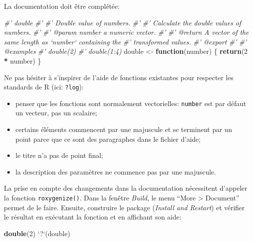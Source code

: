 \documentclass[
  12pt,
  french,
  a4paper,
  extrafontsizes,onecolumn,openright
  ]{memoir}
\newenvironment{Shaded}{\begin{snugshade}}{\end{snugshade}}
\newcommand{\CommentTok}[1]{\textcolor[rgb]{0.56,0.35,0.01}{\textit{#1}}}
\newcommand{\ControlFlowTok}[1]{\textcolor[rgb]{0.13,0.29,0.53}{\textbf{#1}}}
\newcommand{\DataTypeTok}[1]{\textcolor[rgb]{0.13,0.29,0.53}{#1}}
\newcommand{\DecValTok}[1]{\textcolor[rgb]{0.00,0.00,0.81}{#1}}
\newcommand{\KeywordTok}[1]{\textcolor[rgb]{0.13,0.29,0.53}{\textbf{#1}}}
\newcommand{\NormalTok}[1]{#1}
\newcommand{\OperatorTok}[1]{\textcolor[rgb]{0.81,0.36,0.00}{\textbf{#1}}}
\newcommand{\StringTok}[1]{\textcolor[rgb]{0.31,0.60,0.02}{#1}}
\providecommand{\tightlist}{%
  \setlength{\itemsep}{0pt}\setlength{\parskip}{0pt}}
\begin{document}
La documentation doit être complétée:

\scriptsize

\begin{Shaded}
\begin{Highlighting}[]
\CommentTok{#' double}
\CommentTok{#' }
\CommentTok{#' Double value of numbers.}
\CommentTok{#'}
\CommentTok{#' Calculate the double values of numbers.}
\CommentTok{#' }
\CommentTok{#' @param number a numeric vector.}
\CommentTok{#'}
\CommentTok{#' @return A vector of the same length as `number` containing the }
\CommentTok{#'   transformed values.}
\CommentTok{#' @export}
\CommentTok{#'}
\CommentTok{#' @examples}
\CommentTok{#' double(2)}
\CommentTok{#' double(1:4)}
\NormalTok{double <-}\StringTok{ }\ControlFlowTok{function}\NormalTok{(number) \{}
    \KeywordTok{return}\NormalTok{(}\DecValTok{2} \OperatorTok{*}\StringTok{ }\NormalTok{number)}
\NormalTok{\}}
\end{Highlighting}
\end{Shaded}

\normalsize

Ne pas hésiter à s'inspirer de l'aide de fonctions existantes pour respecter les standards de R (ici: \texttt{?log}):

\begin{itemize}
\tightlist
\item
  penser que les fonctions sont normalement vectorielles: \texttt{number} est par défaut un vecteur, pas un scalaire;
\item
  certains éléments commencent par une majuscule et se terminent par un point parce que ce sont des paragraphes dans le fichier d'aide;
\item
  le titre n'a pas de point final;
\item
  la description des paramètres ne commence pas par une majuscule.
\end{itemize}

La prise en compte des changements dans la documentation nécessitent d'appeler la fonction \texttt{roxygenize()}.
Dans la fenêtre \emph{Build}, le menu \enquote{More \textgreater{} Document} permet de le faire.
Ensuite, construire le package (\emph{Install and Restart}) et vérifier le résultat en exécutant la fonction et en affichant son aide:

\scriptsize

\begin{Shaded}
\begin{Highlighting}[]
\KeywordTok{double}\NormalTok{(}\DecValTok{2}\NormalTok{)}
\StringTok{`}\DataTypeTok{?}\StringTok{`}\NormalTok{(double)}
\end{Highlighting}
\end{Shaded}
\end{document}
